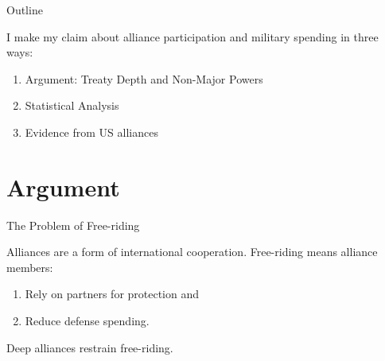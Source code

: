 \documentclass[12pt]{beamer}
\begin{document}

\begin{frame}{Outline}

I make my claim about alliance participation and military spending in three ways: 

\pause
\begin{enumerate}
\item Argument: Treaty Depth and Non-Major Powers
\pause
\item Statistical Analysis
\pause
\item Evidence from US alliances
\end{enumerate}


\end{frame}


\section{Argument}


\begin{frame}{The Problem of Free-riding}

Alliances are a form of international cooperation. Free-riding means alliance members:

\begin{enumerate} 
\pause
\item Rely on partners for protection and  
\pause
\item Reduce defense spending.
\end{enumerate}  

\end{frame}


\begin{frame}[standout]

Deep alliances restrain free-riding.   

\end{frame}

\end{document}

